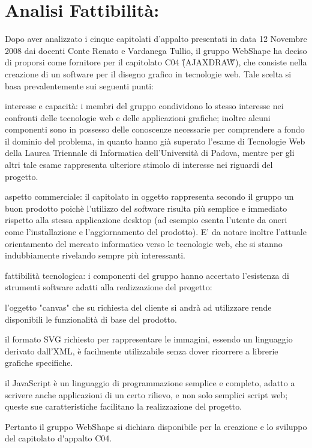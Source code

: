 \section{\Large Analisi Fattibilit\`{a}:}
\indent \indent
Dopo aver analizzato i cinque capitolati d'appalto presentati in data 12 Novembre 2008 
dai docenti Conte Renato e Vardanega Tullio, il gruppo WebShape ha deciso di proporsi come 
fornitore per il capitolato C04 (\H{}AJAXDRAW\H{}), che consiste nella creazione di un software 
per il disegno grafico in tecnologie web.
Tale scelta si basa prevalentemente sui seguenti punti:
	\begin{elenconumerato}{\normindent}
		\item interesse e capacit\`{a}: i membri del gruppo condividono lo stesso interesse nei confronti delle tecnologie web e delle applicazioni grafiche; inoltre alcuni componenti sono in possesso delle conoscenze necessarie per comprendere a fondo il dominio del problema, in quanto hanno gi\`{a} superato l'esame di Tecnologie Web della Laurea Triennale di Informatica dell'Universit\`{a} di Padova, mentre per gli altri tale esame rappresenta ulteriore stimolo di interesse nei riguardi del progetto.
		\item aspetto commerciale: il capitolato in oggetto rappresenta secondo il gruppo un buon prodotto 
		poich\`{e} l'utilizzo del software risulta pi\`{u}  semplice e immediato rispetto alla stessa applicazione desktop	(ad esempio esenta l'utente da oneri come l'installazione e l'aggiornamento del prodotto).
		E' da notare inoltre l'attuale orientamento del mercato informatico verso le tecnologie web, 
		che si stanno indubbiamente rivelando sempre pi\`{u} interessanti.
		\item fattibilit\`{a} tecnologica: i componenti del gruppo hanno accertato l'esistenza di strumenti software adatti alla realizzazione del progetto: 
				\begin{elencopuntato}[\normindent]
					\item l'oggetto "canvas" che su richiesta del cliente si andrà ad utilizzare rende disponibili le funzionalità di base del prodotto.
					\item il formato SVG richiesto per rappresentare le immagini, essendo un linguaggio derivato dall'XML, è facilmente utilizzabile senza dover ricorrere a librerie grafiche specifiche.
					\item il JavaScript è un linguaggio di programmazione semplice e completo, adatto a scrivere anche applicazioni di un certo rilievo, e non solo semplici script web; queste sue caratteristiche facilitano la realizzazione del progetto.
				\end{elencopuntato}
\end{elenconumerato}

Pertanto il gruppo WebShape si dichiara disponibile per la creazione e lo sviluppo del capitolato d\'{}appalto C04.


